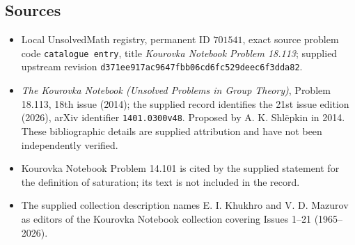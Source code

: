 \documentclass[11pt]{article}
\begin{document}
\subsection{Sources}
\begin{itemize}
\item Local UnsolvedMath registry, permanent ID \(701541\), exact source problem code \texttt{catalogue entry}, title \emph{Kourovka Notebook Problem 18.113}; supplied upstream revision \texttt{d371ee917ac9647fbb06cd6fc529deec6f3dda82}.
\item \emph{The Kourovka Notebook (Unsolved Problems in Group Theory)}, Problem 18.113, 18th issue (2014); the supplied record identifies the 21st issue edition (2026), arXiv identifier \texttt{1401.0300v48}. Proposed by A. K. Shl\"epkin in 2014. These bibliographic details are supplied attribution and have not been independently verified.
\item Kourovka Notebook Problem 14.101 is cited by the supplied statement for the definition of saturation; its text is not included in the record.
\item The supplied collection description names E. I. Khukhro and V. D. Mazurov as editors of the Kourovka Notebook collection covering Issues 1--21 (1965--2026).
\end{itemize}
\end{document}
